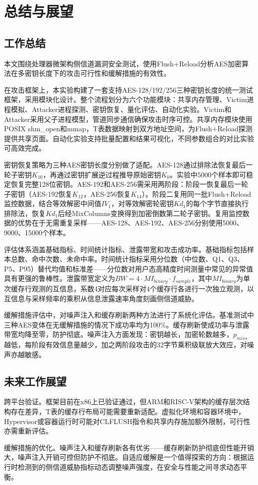 \chapter{总结与展望}

\section{工作总结}

本文围绕处理器微架构侧信道漏洞安全测试，使用Flush+Reload分析AES加密算法在多密钥长度下的攻击可行性和缓解措施的有效性。

在攻击框架上，本实验构建了一套支持AES-128/192/256三种密钥长度的统一测试框架，采用模块化设计。整个流程划分为六个功能模块：共享内存管理、Victim进程模拟、Attacker进程探测、密钥恢复、量化评估、自动化实验。Victim和Attacker采用父子进程模型，管道同步通信确保攻击时序可控。共享内存模块使用POSIX shm\_open和mmap，T表数据映射到双方地址空间，为Flush+Reload探测提供共享页面。自动化实验支持批量配置和结果可视化，不同参数组合的对比实验可高效完成。

密钥恢复策略为三种AES密钥长度分别做了适配。AES-128通过排除法恢复最后一轮子密钥$K_{10}$，再通过密钥扩展逆过程推导原始密钥$K_0$。实验中5000个样本即可稳定恢复完整128位密钥。AES-192和AES-256需采用两阶段：阶段一恢复最后一轮子密钥（AES-192恢复$K_{12}$，AES-256恢复$K_{14}$）。阶段二复用同一批Flush+Reload监控数据，结合等效解密中间值$IV_1$，对等效解密轮密钥$Kd_1$的每个字节直接执行排除法，恢复$Kd_1$后经MixColumns变换得到加密倒数第二轮子密钥。复用监控数据的优势在于无需重复采样——AES-128、AES-192、AES-256分别使用5000、9000、15000个样本。

评估体系涵盖基础指标、时间统计指标、泄露带宽和攻击成功率。基础指标包括样本总数、命中次数、未命中率。时间统计指标采用分位数（中位数、Q1、Q3、P5、P95）替代均值和标准差——分位数对用户态高精度时间测量中常见的异常值具有更强的鲁棒性。泄露带宽定义为$BW = 4 \cdot MI_{binary} \cdot f_{sample}$，其中$MI_{binary}$为单次缓存行观测的互信息，系数4对应每次采样对4个缓存行各进行一次独立观测，以互信息与采样频率的乘积从信息泄露速率角度刻画侧信道威胁。

缓解措施评估中，对噪声注入和缓存刷新两种方法进行了系统化评估。基准测试中三种AES变体在无缓解措施的情况下成功率均为100\%。缓存刷新使成功率与泄露带宽均降至零，防护彻底。噪声注入方面发现：密钥越长，加密轮数越多，$p_{miss}$越低，每阶段有效信息量越少，加之两阶段攻击的32字节乘积级联放大效应，对噪声亦越敏感。

\section{未来工作展望}

跨平台验证。框架目前在x86上已验证通过，但ARM和RISC-V架构的缓存层次结构存在差异，T表的缓存行布局可能需要重新适配。虚拟化环境和容器环境中，Hypervisor或容器运行时可能对CLFLUSH指令和共享内存施加额外限制，可行性亦需重新评估。

缓解措施的优化。噪声注入和缓存刷新各有优劣——缓存刷新防护彻底但性能开销大，噪声注入开销可控但防护不彻底。自适应缓解是一个值得探索的方向：根据运行时检测到的侧信道威胁指标动态调整噪声强度，在安全与性能之间寻求动态平衡。
